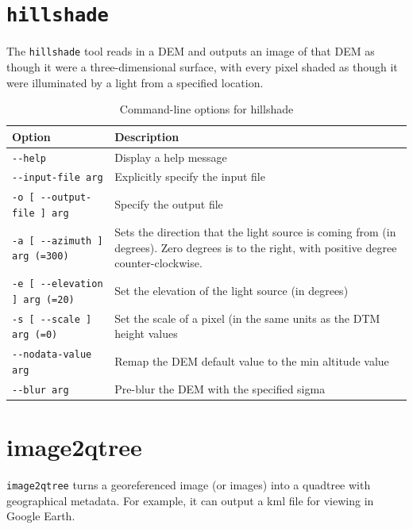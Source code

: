 \section{{\tt hillshade}}
\label{sec:hillshade}

The \verb#hillshade# tool reads in a DEM and outputs an image of that
DEM as though it were a three-dimensional surface, with every pixel
shaded as though it were illuminated by a light from a specified
location.

\begin{longtable}{|l|p{11cm}|}
\caption{Command-line options for hillshade}
\label{tbl:hillshade}
\endfirsthead
\endhead
\endfoot
\endlastfoot
\hline
Option & Description \\ \hline \hline
\verb#--help# & Display a help message\\ \hline
\verb#--input-file arg# & Explicitly specify the input file\\ \hline
\verb#-o [ --output-file ] arg# & Specify the output file\\ \hline
\verb#-a [ --azimuth ] arg (=300)# & Sets the direction that the light source is coming from (in degrees).  Zero degrees is to the right, with positive degree counter-clockwise.\\ \hline
\verb#-e [ --elevation ] arg (=20)# & Set the elevation of the light source (in degrees)\\ \hline
\verb#-s [ --scale ] arg (=0)# & Set the scale of a pixel (in the same units as the DTM height values\\ \hline
\verb#--nodata-value arg# & Remap the DEM default value to the min altitude value\\ \hline
\verb#--blur arg# & Pre-blur the DEM with the specified sigma\\ \hline
\end{longtable}

\section{image2qtree}
\label{sec:image2qtree}

\verb#image2qtree# turns a georeferenced image (or images) into a quadtree with geographical metadata.  For example, it can output a kml file for viewing in Google Earth.


